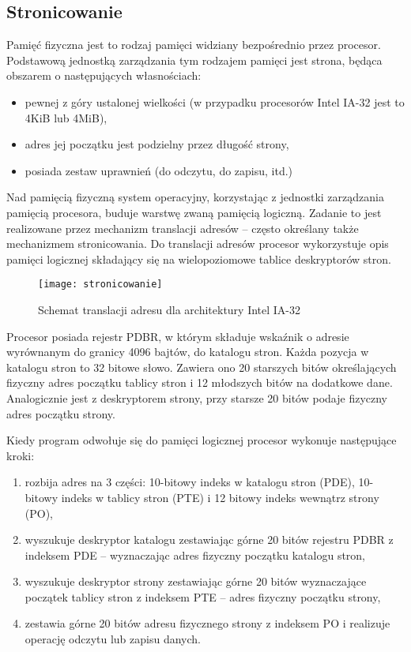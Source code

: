 \documentclass[12pt,a4paper,titlepage,twoside]{mwart}
\begin{document}
\subsection{Stronicowanie}

Pamięć fizyczna jest to rodzaj pamięci widziany bezpośrednio przez procesor.
Podstawową jednostką zarządzania tym rodzajem pamięci jest strona, będąca
obszarem o następujących własnościach:

\begin{itemize}
\item pewnej z góry ustalonej wielkości (w przypadku procesorów Intel
IA-32 jest to 4KiB lub 4MiB),
\item adres jej początku jest podzielny przez długość strony,
\item posiada zestaw uprawnień (do odczytu, do zapisu, itd.)
\end{itemize}

Nad pamięcią fizyczną system operacyjny, korzystając z jednostki zarządzania
pamięcią procesora, buduje warstwę zwaną pamięcią logiczną. Zadanie to jest
realizowane przez mechanizm translacji adresów -- często określany także
mechanizmem stronicowania. Do translacji adresów procesor wykorzystuje opis
pamięci logicznej składający się na wielopoziomowe tablice deskryptorów stron.

\begin{figure}[h]
\centering
\texttt{[image: stronicowanie]}
\caption{Schemat translacji adresu dla architektury Intel IA-32}
\end{figure}

Procesor posiada rejestr PDBR, w którym składuje wskaźnik o adresie wyrównanym
do granicy 4096 bajtów, do katalogu stron. Każda pozycja w katalogu stron to 32
bitowe słowo. Zawiera ono 20 starszych bitów określających fizyczny adres
początku tablicy stron i 12 młodszych bitów na dodatkowe dane. Analogicznie
jest z deskryptorem strony, przy starsze 20 bitów podaje fizyczny adres
początku strony.

Kiedy program odwołuje się do pamięci logicznej procesor wykonuje następujące kroki:
\begin{enumerate}
\item rozbija adres na 3 części: 10-bitowy indeks w katalogu stron (PDE), 10-bitowy
indeks w tablicy stron (PTE) i 12 bitowy indeks wewnątrz strony (PO),
\item wyszukuje deskryptor katalogu zestawiając górne 20 bitów rejestru PDBR z
indeksem PDE -- wyznaczając adres fizyczny początku katalogu stron,
\item wyszukuje deskryptor strony zestawiając górne 20 bitów wyznaczające
początek tablicy stron z indeksem PTE -- adres fizyczny początku strony,
\item zestawia górne 20 bitów adresu fizycznego strony z indeksem PO i
realizuje operację odczytu lub zapisu danych.
\end{enumerate}
\end{document}

